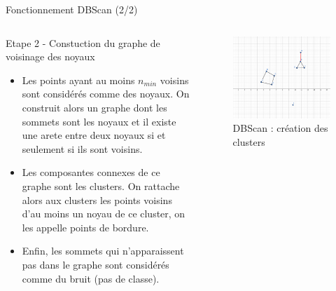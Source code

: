 \begin{frame}{Fonctionnement DBScan (2/2)}
    \begin{columns}
        \begin{column}{0.55\textwidth}
            \begin{block}{Etape 2 - Constuction du graphe de voisinage des noyaux}
                \begin{itemize}
                    \item Les points ayant au moins $n_{min}$ voisins sont considérés comme des noyaux. On construit alors un graphe dont les sommets sont les noyaux et il existe une arete entre deux noyaux si et seulement si ils sont voisins.
                    \item Les composantes connexes de ce graphe sont les clusters. On rattache alors aux clusters les points voisins d'au moins un noyau de ce cluster, on les appelle points de bordure.
                    \item Enfin, les sommets qui n'apparaissent pas dans le graphe sont considérés comme du bruit (pas de classe).
                \end{itemize}
            \end{block}
        \end{column}
        \begin{column}{0.45\textwidth}
            \begin{figure}
                \includegraphics[height=0.5\paperheight]{images/Illustration_DBScan_2.png}
                \caption{\label{fig:ill_DBScan_2} DBScan : création des clusters}
            \end{figure}
        \end{column}
    \end{columns}
\end{frame}

